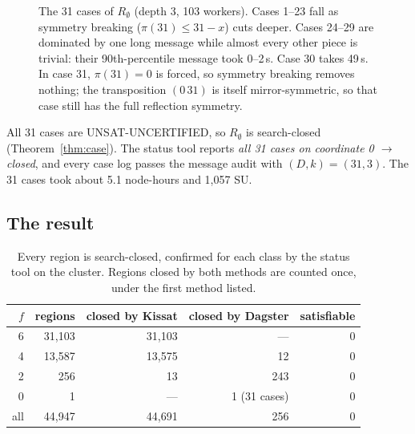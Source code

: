\documentclass[11pt,a4paper]{article}
\theoremstyle{definition}
\newcommand{\st}[1]{\textsf{#1}}
\begin{document}
\begin{figure}[H]
\centering
{}
\caption{The 31 cases of $R_\emptyset$ (depth 3, 103 workers). Cases 1--23 fall as symmetry
breaking ($\pi(31)\le31-x$) cuts deeper. Cases 24--29 are dominated by one long message
while almost every other piece is trivial: their 90th-percentile message took 0--2\,s.
Case 30 takes 49\,s. In case 31, $\pi(31)=0$ is forced, so symmetry breaking removes
nothing; the transposition $(0\,31)$ is itself mirror-symmetric, so that case still has the full
reflection symmetry.}
\label{fig:f0}
\end{figure}

All 31 cases are \st{UNSAT-UNCERTIFIED}, so $R_\emptyset$ is \st{search-closed}
(Theorem~\ref{thm:case}). The status tool reports \emph{all 31 cases on coordinate 0
$\to$ closed}, and every case log passes the message audit with $(D,k)=(31,3)$. The 31
cases took about 5.1 node-hours and 1{,}057 SU.

\subsection{The result}\label{sec:result}

\begin{table}[H]
\centering
\begin{tabular}{@{}rrrrr@{}}
\toprule
$f$ & regions & closed by Kissat & closed by Dagster & satisfiable \\
\midrule
6 & 31{,}103 & 31{,}103 & --- & 0 \\
4 & 13{,}587 & 13{,}575 & 12 & 0 \\
2 & 256 & 13 & 243 & 0 \\
0 & 1 & --- & 1 (31 cases) & 0 \\
\midrule
all & 44{,}947 & 44{,}691 & 256 & 0 \\
\bottomrule
\end{tabular}
\caption{Every region is \st{search-closed}, confirmed for each class by the status tool on
the cluster. Regions closed by both methods are counted once, under the first method listed.}
\label{tab:final}
\end{table}
\end{document}
